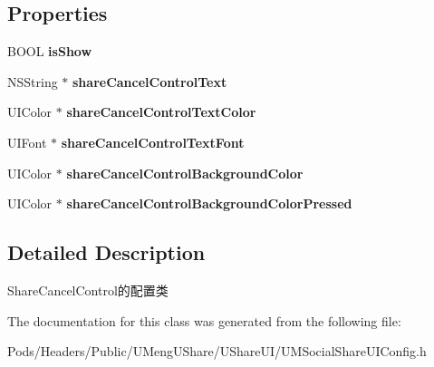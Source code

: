 \subsection*{Properties}
\begin{DoxyCompactItemize}
\item 
\mbox{\label{interface_u_m_social_share_cancel_control_config_a57ef91f16982eb36b805174c8786b5cc}} 
B\+O\+OL {\bfseries is\+Show}
\item 
\mbox{\label{interface_u_m_social_share_cancel_control_config_ae5b4243fb345f6616bc8d6456c2b2363}} 
N\+S\+String $\ast$ {\bfseries share\+Cancel\+Control\+Text}
\item 
\mbox{\label{interface_u_m_social_share_cancel_control_config_ac46bfd699501abcdcf211cf06f03ea51}} 
U\+I\+Color $\ast$ {\bfseries share\+Cancel\+Control\+Text\+Color}
\item 
\mbox{\label{interface_u_m_social_share_cancel_control_config_abf6142f720c67712714895cd38b6a1e5}} 
U\+I\+Font $\ast$ {\bfseries share\+Cancel\+Control\+Text\+Font}
\item 
\mbox{\label{interface_u_m_social_share_cancel_control_config_ab8633e883f5f2955dee9f00d21f847df}} 
U\+I\+Color $\ast$ {\bfseries share\+Cancel\+Control\+Background\+Color}
\item 
\mbox{\label{interface_u_m_social_share_cancel_control_config_a493886c806528c1f27caa0f768a79e47}} 
U\+I\+Color $\ast$ {\bfseries share\+Cancel\+Control\+Background\+Color\+Pressed}
\end{DoxyCompactItemize}


\subsection{Detailed Description}
Share\+Cancel\+Control的配置类 

The documentation for this class was generated from the following file\+:\begin{DoxyCompactItemize}
\item 
Pods/\+Headers/\+Public/\+U\+Meng\+U\+Share/\+U\+Share\+U\+I/U\+M\+Social\+Share\+U\+I\+Config.\+h\end{DoxyCompactItemize}
